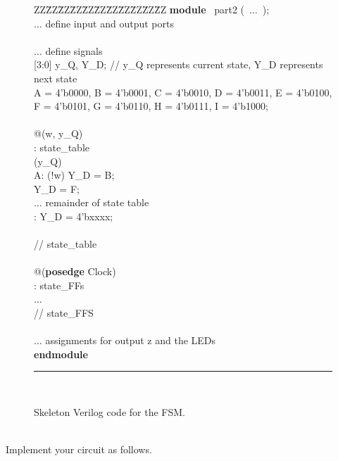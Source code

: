 \documentclass[epsfig,10pt,fullpage]{article}
\begin{document}
\begin{figure}[H]
\begin{center}
\begin{minipage}[t]{12.5 cm}
\begin{tabbing}
ZZ\=ZZ\=ZZ\=ZZ\=ZZ\=ZZ\=ZZ\=ZZ\=ZZ\=ZZ\=ZZ\kill
{\bf module} ~part2 (~$\ldots$~);\\
\>$\ldots$ define input and output ports\\
~\\
\>$\ldots$ define signals\\
 [3:0] y\_Q, Y\_D;  \>\>\>\>\>\>\>\>// y\_Q represents current state, Y\_D represents next state\\
 A = 4'b0000, B = 4'b0001, C = 4'b0010, D = 4'b0011, E = 4'b0100,\\
\>\>F = 4'b0101, G = 4'b0110, H = 4'b0111, I = 4'b1000;\\
~\\
 @(w, y\_Q)\\
: state\_table\\
\> (y\_Q)\\
\>\>\>A:	 (!w) Y\_D = B;\\
\>\>\> Y\_D = F;\\
\>\>\>$\ldots$ remainder of state table \\
\>\>: Y\_D = 4'bxxxx;\\
\>\\
 // state\_table\\
\\
 @({\bf posedge} Clock)\\
: state\_FFs\\
\>\>$\ldots$ \\
 // state\_FFS\\
\\
\>$\ldots$ assignments for output z and the LEDs\\
{\bf endmodule}
~\rule{5.0in}{0in}\\
\end{tabbing}
\end{minipage}
\end{center}
\caption{Skeleton Verilog code for the FSM.}
\label{fig:skeleton_code}
\end{figure}
~\\
Implement your circuit as follows.
\end{document}
